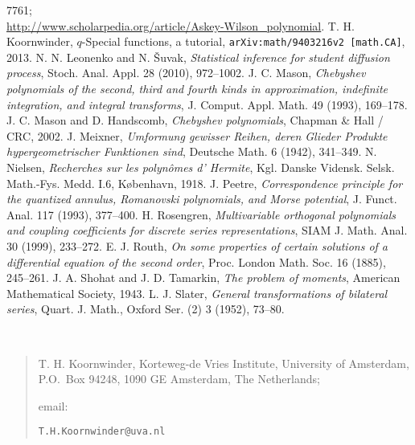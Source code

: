 \documentclass[twoside,11pt]{article}
\begin{document}
\begin{thebibliography}{999}
7761;\\
 \url{http://www.scholarpedia.org/article/Askey-Wilson_polynomial}.
%
T. H. Koornwinder,
{$q$-Special functions, a tutorial},
{\tt arXiv:math/9403216v2 [math.CA]}, 2013.
 N. N. Leonenko and N. \v{S}uvak,
{\em Statistical inference for student diffusion process},
Stoch. Anal. Appl. 28 (2010), 972--1002.
%
J. C. Mason, 
{\em Chebyshev polynomials of the second, third and fourth kinds in
approximation, indefinite integration, and integral transforms},
J. Comput. Appl. Math. 49 (1993), 169--178.
%
J. C. Mason and D. Handscomb,
{\em Chebyshev polynomials},
Chapman \& Hall / CRC, 2002.
%
J. Meixner,
{\em Umformung gewisser Reihen, deren Glieder Produkte hypergeometrischer 
Funktionen sind},
Deutsche Math.  6 (1942),  341--349.
%
N. Nielsen,
{\em Recherches sur les polyn\^omes d' Hermite},
Kgl. Danske Vidensk. Selsk. Math.-Fys. Medd. I.6, K\o benhavn, 1918.
%
J. Peetre,
{\em Correspondence principle for the quantized annulus, Romanovski  polynomials,
and Morse potential},
J. Funct. Anal.  117 (1993), 377--400.
%
H. Rosengren,
{\em Multivariable orthogonal polynomials and coupling coefficients for 
discrete series representations},
SIAM J. Math. Anal.  30  (1999),  233--272.
%
E. J. Routh,
{\em On some properties of certain solutions of a differential equation of the second order},
Proc. London Math. Soc. 16 (1885), 245--261.
%
J. A. Shohat and J. D. Tamarkin,
{\em The problem of moments},
American Mathematical Society, 1943.
%
L. J. Slater,
{\em General transformations of bilateral series},
Quart. J. Math., Oxford Ser. (2) 3 (1952), 73--80.
%
\end{thebibliography}
\quad\\
\begin{footnotesize}
\begin{quote}
{T. H. Koornwinder, Korteweg-de Vries Institute, University of Amsterdam,\\
P.O.\ Box 94248, 1090 GE Amsterdam, The Netherlands;

\vspace{\smallskipamount}
email: }{\tt T.H.Koornwinder@uva.nl}
\end{quote}
\end{footnotesize}
\end{document}
